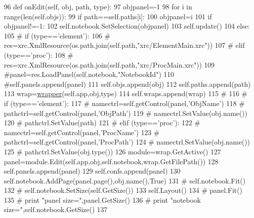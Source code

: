 \begin{DoxyCode}
96     \textcolor{keyword}{def }onEdit(self, obj, path, type):
97         objpanel=-1
98         \textcolor{keywordflow}{for} i \textcolor{keywordflow}{in} range(len(self.objs)):
99             \textcolor{keywordflow}{if} path==self.paths[i]:
100                 objpanel=i
101         \textcolor{keywordflow}{if} objpanel!=-1:
102             self.notebook.SetSelection(objpanel)
103             self.update()
104         \textcolor{keywordflow}{else}:
105 \textcolor{comment}{#            if (type=='element'):}
106 \textcolor{comment}{#                res=xrc.XmlResource(os.path.join(self.path,"xrc/ElementMain.xrc"))}
107 \textcolor{comment}{#            elif (type=='proc'):}
108 \textcolor{comment}{#                res=xrc.XmlResource(os.path.join(self.path,"xrc/ProcMain.xrc"))}
109             \textcolor{comment}{#panel=res.LoadPanel(self.notebook,"NotebookId")}
110             \textcolor{comment}{#self.panels.append(panel)}
111             self.objs.append(obj)
112             self.paths.append(path)
113             wrap=\hyperlink{namespacewrapper}{wrapper}(self.app,obj,type)
114             self.wraps.append(wrap)
115 \textcolor{comment}{#            }
116 \textcolor{comment}{#            if (type=='element'):}
117 \textcolor{comment}{#                namectrl=self.getControl(panel,'ObjName')}
118 \textcolor{comment}{#                pathctrl=self.getControl(panel,'ObjPath')}
119 \textcolor{comment}{#                namectrl.SetValue(obj.name())}
120 \textcolor{comment}{#                pathctrl.SetValue(path)}
121 \textcolor{comment}{#            elif (type=='proc'):}
122 \textcolor{comment}{#                namectrl=self.getControl(panel,'ProcName')}
123 \textcolor{comment}{#                pathctrl=self.getControl(panel,'ProcPath')}
124 \textcolor{comment}{#                namectrl.SetValue(obj.name())}
125 \textcolor{comment}{#                pathctrl.SetValue(obj.type())}
126             module=wrap.GetActive()
127             panel=module.Edit(self.app,obj,self.notebook,wrap.GetFilePath())
128             self.panels.append(panel)
129             self.confs.append(panel)
130             self.notebook.AddPage(panel.page(),obj.name(),\textcolor{keyword}{True})
131 \textcolor{comment}{#            self.notebook.Fit()}
132 \textcolor{comment}{#            self.notebook.SetSize(self.GetSize())}
133             self.Layout()
134 \textcolor{comment}{#            panel.Fit()}
135 \textcolor{comment}{#            print "panel size=",panel.GetSize()}
136 \textcolor{comment}{#            print "notebook size=",self.notebook.GetSize()}
137             
\end{DoxyCode}
\mbox{\label{classConfFrame_1_1ConfFrame_ade9e2d205fbe79ecc809d80233323387}} 

